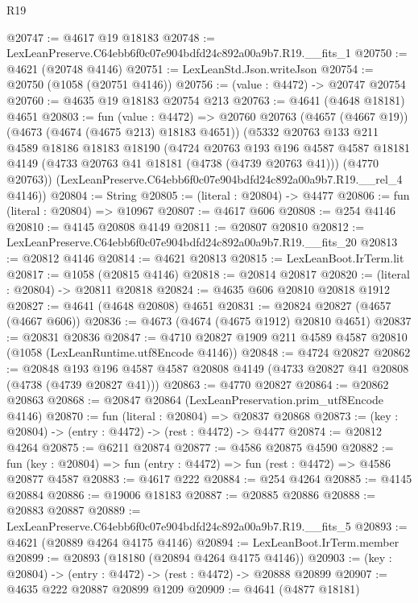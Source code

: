 \begin{lexlean}{R19}
\begin{coremodule}
@20747 := @4617 @19 @18183
@20748 := LexLeanPreserve.C64ebb6f0c07e904bdfd24c892a00a9b7.R19.__fits_1
@20750 := @4621 (@20748 @4146)
@20751 := LexLeanStd.Json.writeJson
@20754 := @20750 (@1058 (@20751 @4146))
@20756 := (value : @4472) -> @20747 @20754
@20760 := @4635 @19 @18183 @20754 @213
@20763 := @4641 (@4648 @18181) @4651
@20803 := fun (value : @4472) =>
  @20760
    @20763
    (@4657 (@4667 @19))
    (@4673 (@4674 (@4675 @213) @18183 @4651))
    (@5332
      @20763
      @133
      @211
      @4589
      @18186
      @18183
      @18190
      (@4724
        @20763
        @193
        @196
        @4587
        @4587
        @18181
        @4149
        (@4733 @20763 @41 @18181 (@4738 (@4739 @20763 @41)))
        (@4770 @20763))
      (LexLeanPreserve.C64ebb6f0c07e904bdfd24c892a00a9b7.R19.__rel_4 @4146))
@20804 := String
@20805 := (literal : @20804) -> @4477
@20806 := fun (literal : @20804) => @10967
@20807 := @4617 @606
@20808 := @254 @4146
@20810 := @4145 @20808 @4149
@20811 := @20807 @20810
@20812 := LexLeanPreserve.C64ebb6f0c07e904bdfd24c892a00a9b7.R19.__fits_20
@20813 := @20812 @4146
@20814 := @4621 @20813
@20815 := LexLeanBoot.IrTerm.lit
@20817 := @1058 (@20815 @4146)
@20818 := @20814 @20817
@20820 := (literal : @20804) -> @20811 @20818
@20824 := @4635 @606 @20810 @20818 @1912
@20827 := @4641 (@4648 @20808) @4651
@20831 := @20824 @20827 (@4657 (@4667 @606))
@20836 := @4673 (@4674 (@4675 @1912) @20810 @4651)
@20837 := @20831 @20836
@20847 := @4710 @20827 @1909 @211 @4589 @4587 @20810 (@1058 (LexLeanRuntime.utf8Encode @4146))
@20848 := @4724 @20827
@20862 := @20848
    @193
    @196
    @4587
    @4587
    @20808
    @4149
    (@4733 @20827 @41 @20808 (@4738 (@4739 @20827 @41)))
@20863 := @4770 @20827
@20864 := @20862 @20863
@20868 := @20847 @20864 (LexLeanPreservation.prim_utf8Encode @4146)
@20870 := fun (literal : @20804) => @20837 @20868
@20873 := (key : @20804) -> (entry : @4472) -> (rest : @4472) -> @4477
@20874 := @20812 @4264
@20875 := @6211 @20874
@20877 := @4586 @20875 @4590
@20882 := fun (key : @20804) => fun (entry : @4472) => fun (rest : @4472) => @4586 @20877 @4587
@20883 := @4617 @222
@20884 := @254 @4264
@20885 := @4145 @20884
@20886 := @19006 @18183
@20887 := @20885 @20886
@20888 := @20883 @20887
@20889 := LexLeanPreserve.C64ebb6f0c07e904bdfd24c892a00a9b7.R19.__fits_5
@20893 := @4621 (@20889 @4264 @4175 @4146)
@20894 := LexLeanBoot.IrTerm.member
@20899 := @20893 (@18180 (@20894 @4264 @4175 @4146))
@20903 := (key : @20804) -> (entry : @4472) -> (rest : @4472) -> @20888 @20899
@20907 := @4635 @222 @20887 @20899 @1209
@20909 := @4641 (@4877 @18181)

\end{coremodule}
\end{lexlean}
